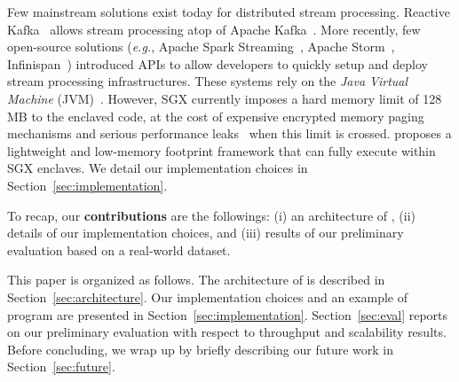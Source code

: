 Few mainstream solutions exist today for distributed stream processing.
Reactive Kafka~\cite{reactivekafka} allows stream processing atop of Apache Kafka~\cite{apachekafka}.
More recently, few open-source solutions (\emph{e.g.}, Apache Spark Streaming~\cite{apachesparkstreaming}, Apache Storm~\cite{apachestorm}, Infinispan~\cite{infinispan}) introduced APIs to allow developers to quickly setup and deploy stream processing infrastructures.
These systems rely on the \emph{Java Virtual Machine} (JVM)~\cite{lindholm2014java}.
However, SGX currently imposes a hard memory limit of 128\,MB to the enclaved code, at the cost of expensive encrypted memory paging mechanisms and serious performance leaks~\cite{brenner_securekeeper:_2016} when this limit is crossed.
\SYS{} proposes a lightweight and low-memory footprint framework that can fully execute within SGX enclaves.
We detail our implementation choices in Section~\ref{sec:implementation}.

To recap, our \textbf{contributions} are the followings: (i) an architecture of \SYS{}, (ii) details of our implementation choices, and (iii) results of our preliminary evaluation based on a real-world dataset.

This paper is organized as follows.
The architecture of \SYS{} is described in Section~\ref{sec:architecture}.
Our implementation choices and an example of \SYS{} program are presented in Section~\ref{sec:implementation}.
Section~\ref{sec:eval} reports on our preliminary evaluation with respect to throughput and scalability results.
Before concluding, we wrap up by briefly describing our future work in Section~\ref{sec:future}.
